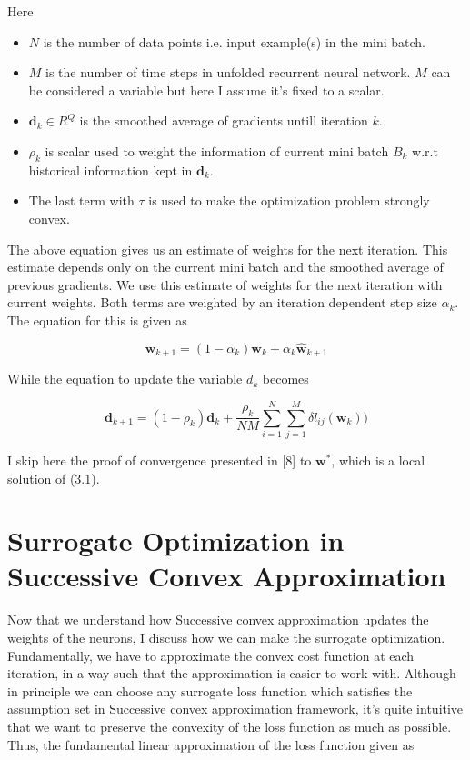Here
\begin{itemize}
  \item $N$ is the number of data points i.e. input example(s) in the mini batch.
  \item $M$ is the number of time steps in unfolded recurrent neural network. $M$ can be considered a variable but here I assume it's fixed to a scalar.
  \item $\textbf{d}_k\in R^Q$ is the smoothed average of gradients untill iteration $k$.
  \item $\rho_k$ is scalar used to weight the information of current mini batch $B_k$ w.r.t historical information kept in $\textbf{d}_k$.
  \item The last term with $\tau$ is used to make the optimization problem strongly convex.
\end{itemize}

The above equation gives us an estimate of weights for the next iteration. This estimate depends only on the current mini batch and the smoothed average of previous gradients. We use this estimate of weights for the next iteration with current weights. Both terms are weighted by an iteration dependent step size 
$\alpha_k$. The equation for this is given as

\begin{equation}
\textbf{w}_{k+1} = (1-\alpha_k) \textbf{w}_k + \alpha_k \hat{\textbf{w}}_{k+1}
\end{equation}

While the equation to update the variable $d_k$ becomes

\begin{equation}
\textbf{d}_{k+1} = (1-\rho_k) \textbf{d}_k + \frac{\rho_k}{NM}  \sum_{i=1}^{N} \sum_{j=1}^{M} \delta l_{ij}(\textbf{w}_k))
\end{equation}

I skip here the proof of convergence presented in [8] to $\textbf{w}^*$, which is a local solution of (3.1). 

\section {Surrogate Optimization in Successive Convex Approximation}

Now that we understand how Successive convex approximation updates the weights of the neurons, I discuss how we can make the surrogate optimization. Fundamentally, we have to approximate the convex cost function at each iteration, in a way such that the approximation is easier to work with. Although in principle we can choose any surrogate loss function which satisfies the assumption set in Successive convex approximation framework, it's quite intuitive that we want to preserve the convexity of the loss function as much as possible. Thus, the fundamental linear approximation of the loss function given as

